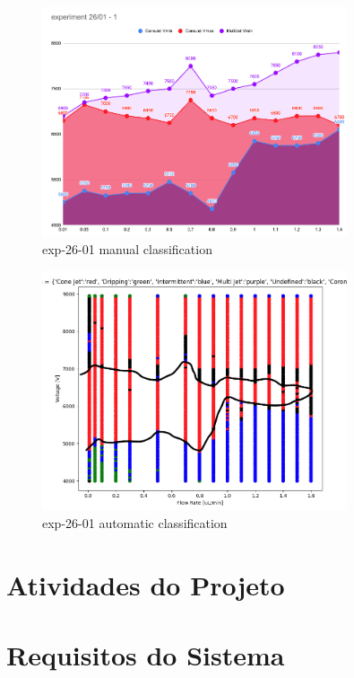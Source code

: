 \begin{multicols}{2}


    \begin{figure}[H]
        \center
        \includegraphics[width=9cm]{Figuras/report3/manual-mapping.png}
        \caption{ exp-26-01 manual classification}
    \end{figure}

    \begin{figure}[H]
        \center
        \includegraphics[width=9cm]{Figuras/report3/map4-stabilityIsland.png}
        \caption{ exp-26-01 automatic classification}
    \end{figure}

\end{multicols}




\section{Atividades do Projeto}
\label{metodo3}

\section {Requisitos do Sistema}
\label{req}


\clearpage